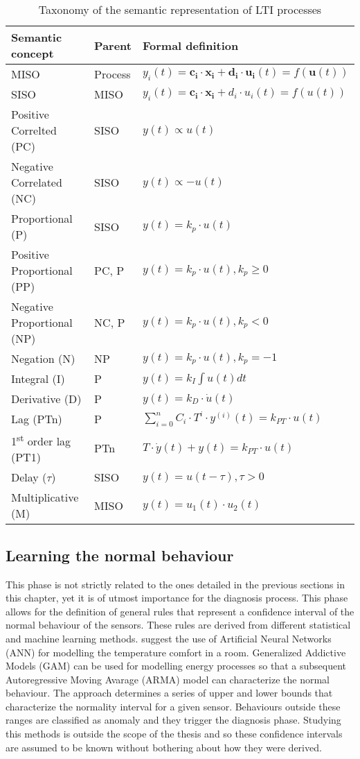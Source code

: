 \begin{table}
  \centering
  \caption{Taxonomy of the semantic representation of LTI processes}
  \label{tab:lti_taxonomy}
  \begin{tabular}{lll}\hline
    \textbf{Semantic concept} & \textbf{Parent} & \textbf{Formal definition} \\\hline
    MISO & Process & $y_i(t)=\bm{c_i}\cdot \bm{x_i}+\bm{d_i}\cdot \bm{u_i}(t)=f(\bm{u}(t))$ \\\hline
    SISO & MISO & $y_i(t)=\bm{c_i}\cdot \bm{x_i}+d_i\cdot u_i(t)=f(u(t))$ \\\hline
    Positive Correlted (PC) & SISO & $y(t)\propto u(t)$ \\
    Negative Correlated (NC) & SISO & $y(t)\propto -u(t)$ \\
    Proportional (P) & SISO & $y(t)=k_p\cdot u(t)$ \\
    Positive Proportional (PP) & PC, P & $y(t)=k_p\cdot u(t), k_p\geq 0$\\
    Negative Proportional (NP) & NC, P & $y(t)=k_p\cdot u(t), k_p<0$\\
    Negation (N) & NP & $y(t)=k_p\cdot u(t), k_p=-1$\\
    Integral (I) & P & $y(t)=k_I\int u(t)dt$\\
    Derivative (D) & P & $y(t)=k_D\cdot\dot u(t)$\\
    Lag (PTn) & P & $\sum_{i=0}^{n}C_i\cdot T^i \cdot y^{(i)}(t)=k_{PT}\cdot u(t) $\\
    1\textsuperscript{st} order lag (PT1) & PTn & $T\cdot\dot y(t)+y(t)=k_{PT}\cdot u(t)$\\
    Delay ($\tau$) & SISO & $y(t)=u(t-\tau), \tau>0$\\
    Multiplicative (M) & MISO & $y(t)=u_1(t)\cdot u_2(t)$
  \end{tabular}
\end{table}

\subsection{Learning the normal behaviour}\label{subsec:learn_behaviour}
This phase is not strictly related to the ones detailed in the previous sections in this chapter, yet it is of utmost importance for the diagnosis process. This phase allows for the definition of general rules that represent a confidence interval of the normal behaviour of the sensors. These rules are derived from different statistical and machine learning methods. \textcite{inproceedings_cognitive_buildings} suggest the use of Artificial Neural Networks (ANN) for modelling the temperature comfort in a room. Generalized Addictive Models (GAM) can be used for modelling energy processes so that a subsequent Autoregressive Moving Avarage (ARMA) model can characterize the normal behaviour\cite{e2d}. The approach determines a series of upper and lower bounds that characterize the normality interval for a given sensor. Behaviours outside these ranges are classified as anomaly and they trigger the diagnosis phase. Studying this methods is outside the scope of the thesis and so these confidence intervals are assumed to be known without bothering about how they were derived.

